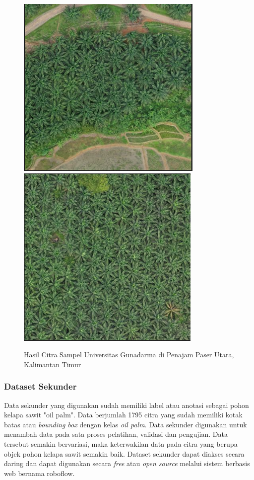 \begin{figure}[H]
	\vspace{-0.1cm}
	\begin{center}
		\includegraphics[width=0.6\columnwidth]{bab4/Gambar/Picture5.1.png}
		\hspace{1cm}
		\includegraphics[width=0.6\columnwidth]{bab4/Gambar/Picture5.2.png}
	\end{center}
	\vspace{-0.2cm}
	\captionsetup{justification=centering}
	\caption{Hasil Citra Sampel Universitas Gunadarma di Penajam Paser Utara, Kalimantan Timur}\label{img:Hasil-Citra-Sampel-Universitas-Gunadarma-2}
\end{figure}

\subsubsection{Dataset Sekunder}
\hspace{1,2cm}
Data sekunder yang digunakan sudah memiliki label atau anotasi sebagai pohon kelapa sawit "oil palm". Data berjumlah 1795 citra yang sudah memiliki kotak batas atau \textit{bounding box} dengan kelas \textit{oil palm}. Data sekunder digunakan untuk menambah data pada sata proses pelatihan, validasi dan pengujian. Data tersebut semakin bervariasi, maka keterwakilan data pada citra yang berupa objek pohon kelapa sawit semakin baik. Dataset sekunder dapat diakses secara daring dan dapat digunakan secara \textit{free} atau \textit{open source} melalui sistem berbasis web bernama roboflow.

